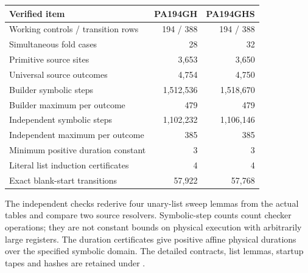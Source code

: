 \begin{center}\small
\begin{tabular}{@{}lrr@{}}
\toprule Verified item & PA194GH & PA194GHS\\\midrule
Working controls / transition rows & 194 / 388 & 194 / 388\\
Simultaneous fold cases & 28 & 32\\
Primitive source sites & 3,653 & 3,650\\
Universal source outcomes & 4,754 & 4,750\\
Builder symbolic steps & 1,512,536 & 1,518,670\\
Builder maximum per outcome & 479 & 479\\
Independent symbolic steps & 1,102,232 & 1,106,146\\
Independent maximum per outcome & 385 & 385\\
Minimum positive duration constant & 3 & 3\\
Literal list induction certificates & 4 & 4\\
Exact blank-start transitions & 57,922 & 57,768\\
\bottomrule\end{tabular}
\end{center}
The independent checks rederive four unary-list sweep lemmas from the
actual tables and compare two source resolvers. Symbolic-step counts
count checker operations; they are not constant bounds on physical
execution with arbitrarily large registers. The duration certificates
give positive affine physical durations over the specified symbolic domain.
The detailed contracts, list lemmas, startup tapes and hashes are retained
under .
